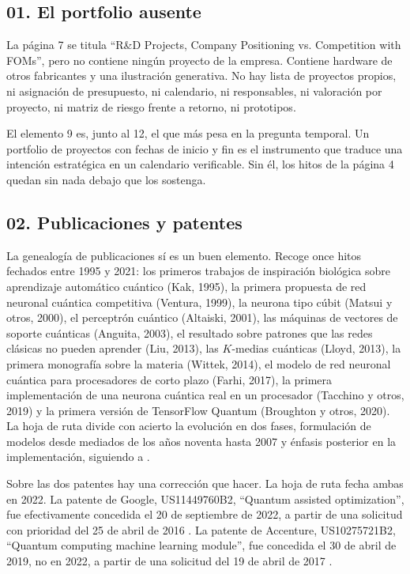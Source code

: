 \documentclass[11pt,letterpaper]{article}
\begin{document}
\subsection*{01. El portfolio ausente}

La página 7 se titula \enquote{R\&D Projects, Company Positioning vs.
Competition with FOMs}, pero no contiene ningún proyecto de la empresa.
Contiene hardware de otros fabricantes y una ilustración generativa. No hay
lista de proyectos propios, ni asignación de presupuesto, ni calendario, ni
responsables, ni valoración por proyecto, ni matriz de riesgo frente a retorno,
ni prototipos.

El elemento 9 es, junto al 12, el que más pesa en la pregunta temporal. Un
portfolio de proyectos con fechas de inicio y fin es el instrumento que traduce
una intención estratégica en un calendario verificable. Sin él, los hitos de la
página 4 quedan sin nada debajo que los sostenga.

\subsection*{02. Publicaciones y patentes}

La genealogía de publicaciones sí es un buen elemento. Recoge once hitos
fechados entre 1995 y 2021: los primeros trabajos de inspiración biológica
sobre aprendizaje automático cuántico (Kak, 1995), la primera propuesta de red
neuronal cuántica competitiva (Ventura, 1999), la neurona tipo cúbit (Matsui y
otros, 2000), el perceptrón cuántico (Altaiski, 2001), las máquinas de vectores
de soporte cuánticas (Anguita, 2003), el resultado sobre patrones que las redes
clásicas no pueden aprender (Liu, 2013), las $K$-medias cuánticas (Lloyd,
2013), la primera monografía sobre la materia (Wittek, 2014), el modelo de red
neuronal cuántica para procesadores de corto plazo (Farhi, 2017), la primera
implementación de una neurona cuántica real en un procesador (Tacchino y otros,
2019) y la primera versión de TensorFlow Quantum (Broughton y otros, 2020). La
hoja de ruta divide con acierto la evolución en dos fases, formulación de
modelos desde mediados de los años noventa hasta 2007 y énfasis posterior en la
implementación, siguiendo a \textcite{alchieri2021}.

Sobre las dos patentes hay una corrección que hacer. La hoja de ruta fecha
ambas en 2022. La patente de Google, US11449760B2, \enquote{Quantum assisted
optimization}, fue efectivamente concedida el 20 de septiembre de 2022, a
partir de una solicitud con prioridad del 25 de abril de 2016
\parencite{patentGoogle2022}. La patente de Accenture, US10275721B2,
\enquote{Quantum computing machine learning module}, fue concedida el 30 de
abril de 2019, no en 2022, a partir de una solicitud del 19 de abril de 2017
\parencite{patentAccenture2019}.
\end{document}
